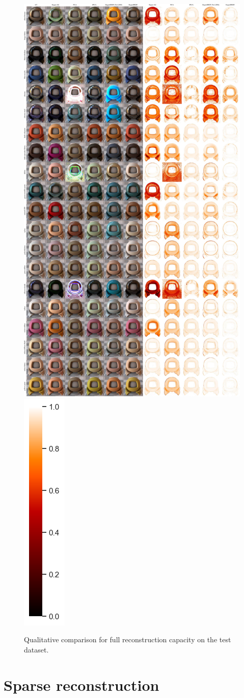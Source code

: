 \begin{figure}[ht]
  \centering
{}%
  {\includegraphics[width=0.66\linewidth]{Chapters/appendix-figs/qualitative_comp_40_all_samples-compressed.pdf}}
    \includegraphics[width=0.02\linewidth]{Chapters/hyperbrdf-figs/vbar.png}

   \caption{Qualitative comparison for full reconstruction capacity on the test dataset.}

   \label{fig:qual_comp}
\end{figure}


\newpage
\section{Sparse reconstruction}

